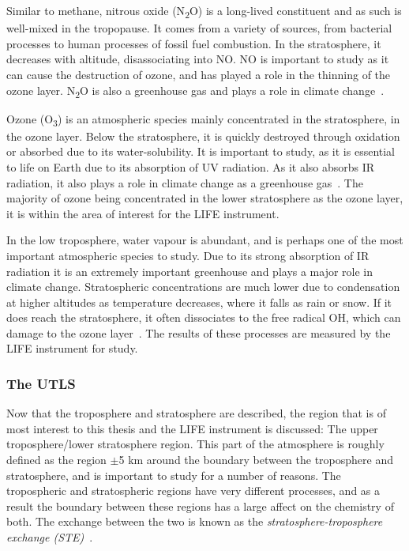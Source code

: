 Similar to methane, nitrous oxide (N\textsubscript{2}O) is a long-lived constituent and as such is well-mixed in the tropopause. It comes from a variety of sources, from bacterial processes to human processes of fossil fuel combustion. In the stratosphere, it decreases with altitude, disassociating into NO. NO is important to study as it can cause the destruction of ozone, and has played a role in the thinning of the ozone layer. N\textsubscript{2}O is also a greenhouse gas and plays a role in climate change~\citep{atmos_phys_and_climate}.

Ozone (O\textsubscript{3}) is an atmospheric species mainly concentrated in the stratosphere, in the ozone layer. Below the stratosphere, it is quickly destroyed through oxidation or absorbed due to its water-solubility. It is important to study, as it is essential to life on Earth due to its absorption of UV radiation. As it also absorbs IR radiation, it also plays a role in climate change as a greenhouse gas~\citep{atmos_phys_and_climate}. The majority of ozone being concentrated in the lower stratosphere as the ozone layer, it is within the area of interest for the LIFE instrument.

In the low troposphere, water vapour is abundant, and is perhaps one of the most important atmospheric species to study. Due to its strong absorption of IR radiation it is an extremely important greenhouse and plays a major role in climate change. Stratospheric concentrations are much lower due to condensation at higher altitudes as temperature decreases, where it falls as rain or snow. If it does reach the stratosphere, it often dissociates to the free radical OH, which can damage to the ozone layer~\citep{atmos_phys_and_climate}. The results of these processes are measured by the LIFE instrument for study.

\subsubsection{The UTLS} \label{UTLS}
Now that the troposphere and stratosphere are described, the region that is of most interest to this thesis and the LIFE instrument is discussed: The upper troposphere/lower stratosphere region. This part of the atmosphere is roughly defined as the region $\pm$5 km around the boundary between the troposphere and stratosphere, and is important to study for a number of reasons. The tropospheric and stratospheric regions have very different processes, and as a result the boundary between these regions has a large affect on the chemistry of both. The exchange between the two is known as the \textit{stratosphere-troposphere exchange (STE)}~\citep{ext_utls}.

